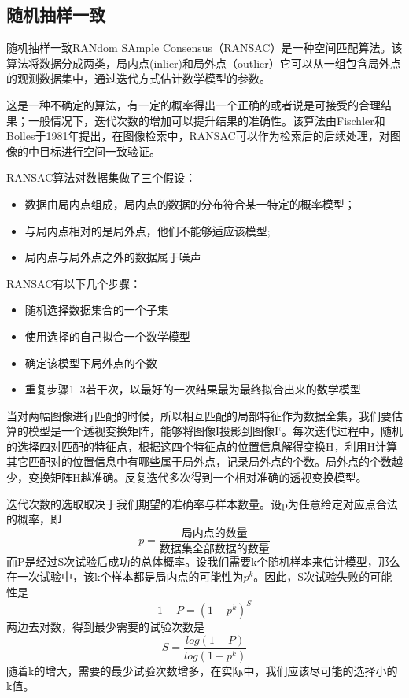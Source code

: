 \subsection{随机抽样一致}
随机抽样一致RANdom SAmple Consensus（RANSAC）是一种空间匹配算法。该算法将数据分成两类，局内点(inlier)和局外点（outlier）它可以从一组包含局外点的观测数据集中，通过迭代方式估计数学模型的参数。

这是一种不确定的算法，有一定的概率得出一个正确的或者说是可接受的合理结果；一般情况下，迭代次数的增加可以提升结果的准确性。该算法由Fischler和Bolles于1981年提出，在图像检索中，RANSAC可以作为检索后的后续处理，对图像的中目标进行空间一致验证。

RANSAC算法对数据集做了三个假设：

\begin{itemize}
\item 数据由局内点组成，局内点的数据的分布符合某一特定的概率模型；
\item 与局内点相对的是局外点，他们不能够适应该模型;
\item 局内点与局外点之外的数据属于噪声
\end{itemize}

RANSAC有以下几个步骤：
\begin{itemize}
\item 随机选择数据集合的一个子集
\item 使用选择的自己拟合一个数学模型
\item 确定该模型下局外点的个数
\item 重复步骤1~3若干次，以最好的一次结果最为最终拟合出来的数学模型
\end{itemize}

当对两幅图像进行匹配的时候，所以相互匹配的局部特征作为数据全集，我们要估算的模型是一个透视变换矩阵，能够将图像I投影到图像I`。每次迭代过程中，随机的选择四对匹配的特征点，根据这四个特征点的位置信息解得变换H，利用H计算其它匹配对的位置信息中有哪些属于局外点，记录局外点的个数。局外点的个数越少，变换矩阵H越准确。反复迭代多次得到一个相对准确的透视变换模型。

迭代次数的选取取决于我们期望的准确率与样本数量。设p为任意给定对应点合法的概率，即
\[p = \frac{\text{局内点的数量}}{\text{数据集全部数据的数量}}\]
而P是经过S次试验后成功的总体概率。设我们需要k个随机样本来估计模型，那么在一次试验中，该k个样本都是局内点的可能性为\(p^k\)。因此，S次试验失败的可能性是
\[1 - P = (1 - p^k)^S\]
两边去对数，得到最少需要的试验次数是
\[S = \frac{log(1-P)}{log(1-p^k)}\]
随着k的增大，需要的最少试验次数增多，在实际中，我们应该尽可能的选择小的k值。

